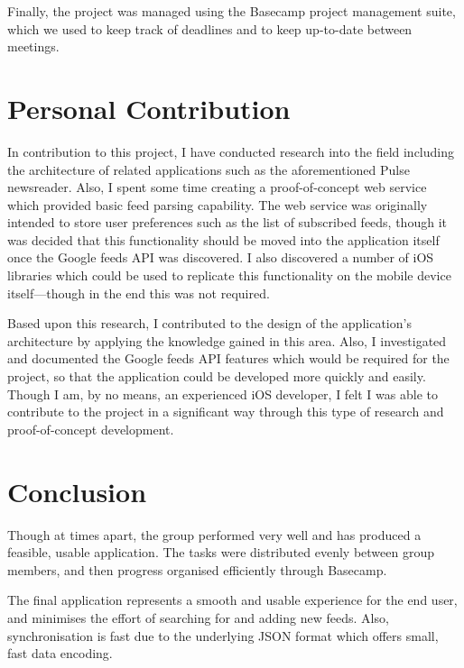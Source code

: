 \documentclass[a4paper,11pt]{article}
\begin{document}
    Finally, the project was managed using the Basecamp project management
    suite, which we used to keep track of deadlines and to keep up-to-date
    between meetings.

    \section{Personal Contribution}

    In contribution to this project, I have conducted research into the field
    including the architecture of related applications such as the
    aforementioned Pulse newsreader. Also, I spent some time creating
    a proof-of-concept web service which provided basic feed parsing
    capability. The web service was originally intended to store user
    preferences such as the list of subscribed feeds, though it was decided
    that this functionality should be moved into the application itself once
    the Google feeds API was discovered. I also discovered a number of iOS
    libraries which could be used to replicate this functionality on the mobile
    device itself---though in the end this was not required.

    Based upon this research, I contributed to the design of the application's
    architecture by applying the knowledge gained in this area. Also,
    I investigated and documented the Google feeds API features which would be
    required for the project, so that the application could be developed more
    quickly and easily. Though I am, by no means, an experienced iOS developer,
    I felt I was able to contribute to the project in a significant way through
    this type of research and proof-of-concept development.

    \section{Conclusion}

    Though at times apart, the group performed very well and has produced
    a feasible, usable application. The tasks were distributed evenly between
    group members, and then progress organised efficiently through Basecamp.

    The final application represents a smooth and usable experience for the end
    user, and minimises the effort of searching for and adding new feeds. Also,
    synchronisation is fast due to the underlying JSON format which offers
    small, fast data encoding.
\end{document}
